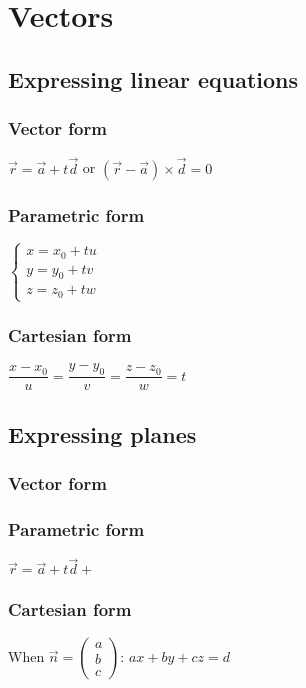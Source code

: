 \documentclass[A4paper]{article}
\begin{document}
	\section{Vectors}
	\subsection{Expressing linear equations}

	\subsubsection{Vector form}
	$\vec{r}=\vec{a}+t\vec{d}$ or $(\vec{r}-\vec{a})\times\vec{d}=0$
	\subsubsection{Parametric form}
	$\begin{cases}
		x=x_0+tu\\
		y=y_0+tv\\
		z=z_0+tw
	\end{cases}$
	\subsubsection{Cartesian form}
	$\dfrac{x-x_0}{u}=\dfrac{y-y_0}{v}=\dfrac{z-z_0}{w}=t$

	\subsection{Expressing planes}
	\subsubsection{Vector form}
	\subsubsection{Parametric form}
	$\vec{r}=\vec{a}+t\vec{d}+$
	\subsubsection{Cartesian form}
	When $\vec{n} = \begin{pmatrix}a\\b\\c\end{pmatrix}$: $ax+by+cz=d$
\end{document}
